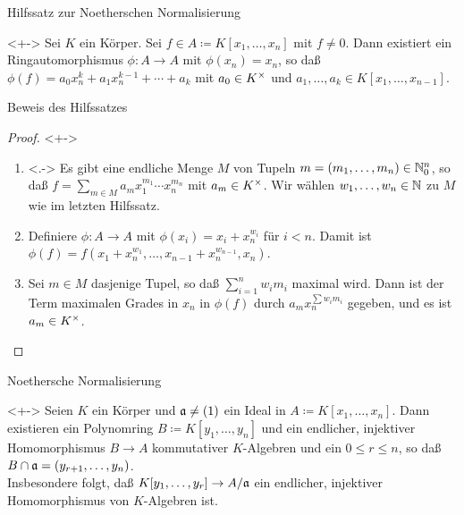 \begin{frame}{Hilfssatz zur Noetherschen Normalisierung}
	\begin{lemma}<+->
		Sei \(K\) ein Körper. Sei \(f \in A \coloneqq K[x_1, \dotsc, x_n]\) mit
		\(f \neq 0\).
		Dann existiert ein Ringautomorphismus \(\phi\colon A \to A\) mit
		\(\phi(x_n) = x_n\), so daß
		\(
		\phi(f) = a_0 x_n^k + a_1 x_n^{k - 1} + \dotsb + a_k\)
		mit \(a_0 \in K^\times\) und \(a_1, \dotsc, a_k \in K[x_1, \dotsc, x_{n - 1}]\).
	\end{lemma}
\end{frame}

\begin{frame}{Beweis des Hilfssatzes}
	\begin{proof}<+->
		\begin{enumerate}[<+->]
		\item<.->
			Es gibt eine endliche Menge \(M\) von Tupeln \(m = (m_1, \dotsc,
			m_n) \in \mathbb N_0^n\), so daß \(f = \sum\limits_{m \in M}
			a_m x_1^{m_1} \dotsm x_n^{m_n}\) mit \(a_m \in K^\times\). Wir
			wählen \(w_1, \dotsc, w_n \in \mathbb N\) zu \(M\) wie im letzten
			Hilfssatz.
		\item
			Definiere \(\phi\colon A \to A\) mit \(\phi(x_i) = x_i + x_n^{w_i}\)
			für \(i < n\). Damit ist
			\(\phi(f) = f(x_1 + x_n^{w_1},
			\dotsc, x_{n - 1} + x_n^{w_{n - 1}}, x_n)\).
		\item
			Sei \(m \in M\) dasjenige Tupel, so daß \(\sum\limits_{i = 1}^n
			w_i m_i\) maximal wird. Dann ist der Term maximalen Grades in
			\(x_n\) in \(\phi(f)\) durch \(a_m x_n^{\sum w_i m_i}\) gegeben,
			und es ist \(a_m \in K^\times\).
		\qedhere
		\end{enumerate}
	\end{proof}
\end{frame}

\begin{frame}{Noethersche Normalisierung}
	\begin{proposition}<+->
		\label{prop:noether_norm}
		Seien \(K\) ein Körper und \(\mathfrak{a} \neq (1)\) ein Ideal in \(A \coloneqq K[x_1, \dotsc, x_n]\).
		Dann existieren ein Polynomring \(B \coloneqq K[y_1, \dotsc, y_n]\) und ein endlicher, injektiver
		Homomorphismus \(B \to A\) kommutativer \(K\)-Algebren und ein \(0 \leq r \leq n\), so daß
		\(B \cap \mathfrak{a} = (y_{r + 1}, \dotsc, y_n)\).
		\\
		Insbesondere folgt, daß \(K[y_1, \dotsc, y_r] \to A/\mathfrak{a}\) ein endlicher, injektiver Homomorphismus
		von \(K\)-Algebren ist.
	\end{proposition}
\end{frame}

